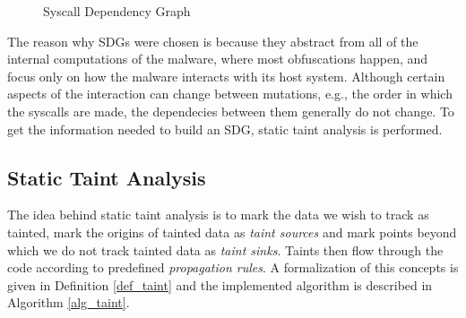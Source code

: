 \begin{figure}[H]
    \centering
    \caption{Syscall Dependency Graph}
    \label{fig_sdg}
\end{figure}

The reason why SDGs were chosen is because they abstract from all of the internal computations of the malware, where most obfuscations happen, and focus only on how the malware interacts with its host system. Although certain aspects of the interaction can change between mutations, e.g., the order in which the syscalls are made, the dependecies between them generally do not change. To get the information needed to build an SDG, static taint analysis is performed.

\subsection{Static Taint Analysis}
The idea behind static taint analysis is to mark the data we wish to track as tainted, mark the origins of tainted data as \emph{taint sources} and mark points beyond which we do not track tainted data as \emph{taint sinks}. Taints then flow through the code according to predefined \emph{propagation rules}. A formalization of this concepts is given in Definition \ref{def_taint} and the implemented algorithm is described in Algorithm \ref{alg_taint}.

